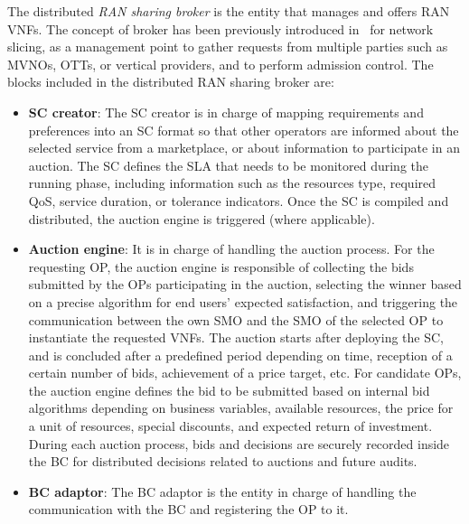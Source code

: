\documentclass[journal]{IEEEtran}
\begin{document}
The distributed \textit{RAN sharing broker} is the entity that manages and offers RAN VNFs. The concept of broker has been previously introduced in~\cite{samdanis2016network} for network slicing, as a management point to gather requests from multiple parties such as MVNOs, OTTs, or vertical providers, and to perform admission control. The blocks included in the distributed RAN sharing broker are:
\begin{itemize}
    \item \textbf{SC creator}: The SC creator is in charge of mapping requirements and preferences into an SC format so that other operators are informed about the selected service from a marketplace, or about information to participate in an auction. The SC defines the SLA that needs to be monitored during the running phase, including information such as the resources type, required QoS, service duration, or tolerance indicators. Once the SC is compiled and distributed, the auction engine is triggered (where applicable).
    \item \textbf{Auction engine}: It is in charge of handling the auction process. For the requesting OP, the auction engine is responsible of collecting the bids submitted by the OPs participating in the auction, selecting the winner based on a precise algorithm for end users' expected satisfaction, and triggering the communication between the own SMO and the SMO of the selected OP to instantiate the requested VNFs. The auction starts after deploying the SC, and is concluded after a predefined period depending on time, reception of a certain number of bids, achievement of a price target, etc. For candidate OPs, the auction engine defines the bid to be submitted based on internal bid algorithms depending on business variables, available resources, the price for a unit of resources, special discounts, and expected return of investment. During each auction process, bids and decisions are securely recorded inside the BC for distributed decisions related to auctions and future audits.
    \item \textbf{BC adaptor}: The BC adaptor is the entity in charge of handling the communication with the BC and registering the OP to it.
\end{itemize}
\end{document}
